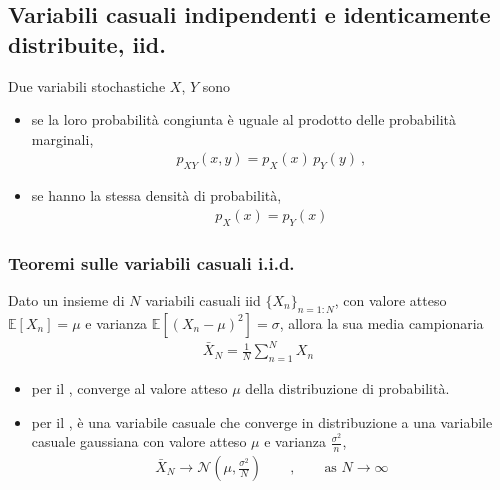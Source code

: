 \documentclass[letterpaper,10pt,italian]{jupyterBook}
\begin{document}
\sphinxstepscope


\subsection{Variabili casuali indipendenti e identicamente distribuite, iid.}
\label{\detokenize{ch/statistics/iid:variabili-casuali-indipendenti-e-identicamente-distribuite-iid}}\label{\detokenize{ch/statistics/iid:statistics-hs-random-variables-iid}}\label{\detokenize{ch/statistics/iid::doc}}
\sphinxAtStartPar
Due variabili stochastiche \(X\), \(Y\) sono
\begin{itemize}
\item {} 
\sphinxAtStartPar
{} se la loro probabilità congiunta è uguale al prodotto delle probabilità marginali,
\begin{equation*}
\begin{split}p_{XY}(x,y) = p_X(x) \, p_Y(y) \ ,\end{split}
\end{equation*}
\item {} 
\sphinxAtStartPar
{} se hanno la stessa densità di probabilità,
\begin{equation*}
\begin{split}p_X(x) = p_Y(x)\end{split}
\end{equation*}
\end{itemize}


\subsubsection{Teoremi sulle variabili casuali i.i.d.}
\label{\detokenize{ch/statistics/iid:teoremi-sulle-variabili-casuali-i-i-d}}
\sphinxAtStartPar
Dato un insieme di \(N\) variabili casuali iid \(\{ X_n \}_{n=1:N}\), con valore atteso \(\mathbb{E}[X_n] = \mu\) e varianza \(\mathbb{E}[(X_n - \mu)^2] = \sigma\), allora la sua media campionaria
\begin{equation*}
\begin{split}\bar{X}_N = \frac{1}{N} \sum_{n=1}^N X_n \ \end{split}
\end{equation*}\begin{itemize}
\item {} 
\sphinxAtStartPar
per il , converge al valore atteso \(\mu\) della distribuzione di probabilità.

\item {} 
\sphinxAtStartPar
per il , è una variabile casuale che converge in distribuzione a una variabile casuale gaussiana con valore atteso \(\mu\) e varianza \(\frac{\sigma^2}{n}\),
\begin{equation*}
\begin{split}\bar{X}_N \rightarrow \mathscr{N}\left(\mu, \frac{\sigma^2}{N} \right) \qquad , \qquad \text{as $N \rightarrow \infty$}\end{split}
\end{equation*}
\end{itemize}
\end{document}
